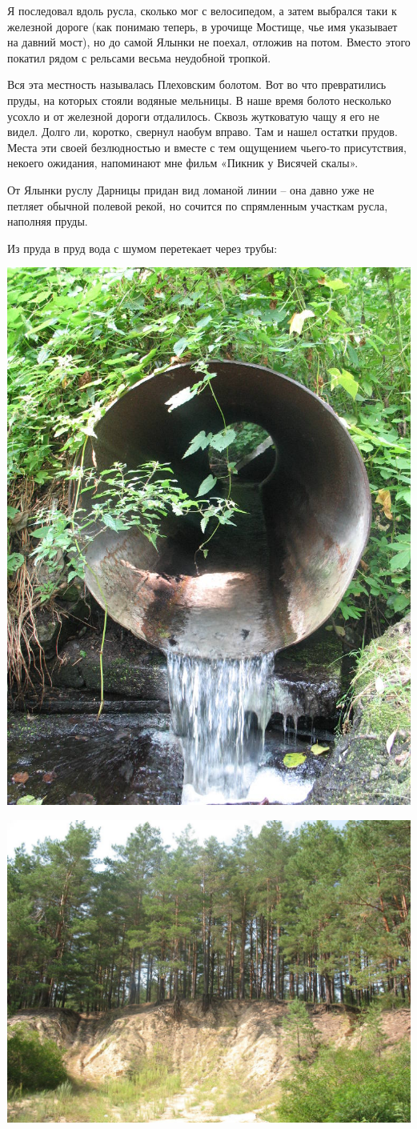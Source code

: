 Я последовал вдоль русла, сколько мог с велосипедом, а затем выбрался таки к железной дороге (как понимаю теперь, в урочище Мостище, чье имя указывает на давний мост), но до самой Ялынки не поехал, отложив на потом. Вместо этого покатил рядом с рельсами весьма неудобной тропкой.

Вся эта местность называлась Плеховским болотом. Вот во что превратились пруды, на которых стояли водяные мельницы. В наше время болото несколько усохло и от железной дороги отдалилось. Сквозь жутковатую чащу я его не видел. Долго ли, коротко, свернул наобум вправо. Там и нашел остатки прудов. Места эти своей безлюдностью и вместе с тем ощущением чьего-то присутствия, некоего ожидания, напоминают мне фильм «Пикник у Висячей скалы».

От Ялынки руслу Дарницы придан вид ломаной линии – она давно уже не петляет обычной полевой рекой, но сочится по спрямленным участкам русла, наполняя пруды.

Из пруда в пруд вода с шумом перетекает через трубы:

\begin{center}
\includegraphics[width=0.51\linewidth]{chast-gorodki/darn/s_darn-IMG_2747.JPG}
\end{center}

\newpage
\vspace*{\fill}
\begin{center}
\includegraphics[width=\linewidth]{chast-gorodki/darn/s_darn-IMG_2743.JPG}
\end{center}

